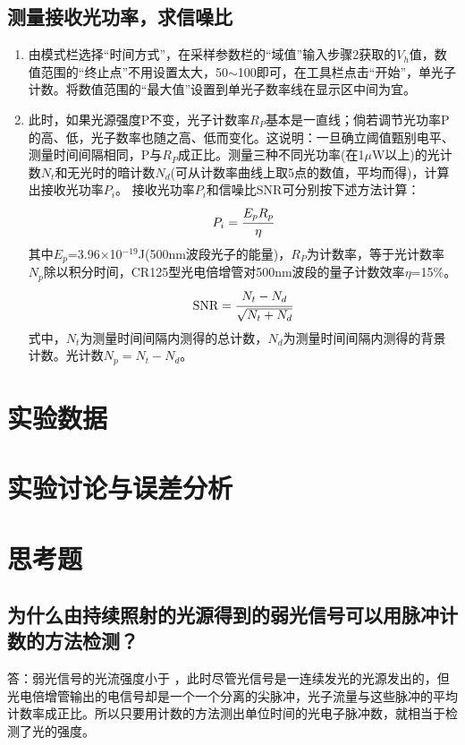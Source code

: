 \documentclass[a4paper]{article}
\begin{document}
\subsection{测量接收光功率，求信噪比}
\begin{enumerate}
\item 由模式栏选择“时间方式”，在采样参数栏的“域值”输入步骤2获取的$V_h$值，数值范围的“终止点”不用设置太大，50$\sim$100即可，在工具栏点击“开始”，单光子计数。将数值范围的“最大值”设置到单光子数率线在显示区中间为宜。 
\item 此时，如果光源强度P不变，光子计数率$R_P$基本是一直线；倘若调节光功率P的高、低，光子数率也随之高、低而变化。这说明：一旦确立阈值甄别电平、测量时间间隔相同，P与$R_P$成正比。测量三种不同光功率(在1$\mu$W以上)的光计数$N_t$和无光时的暗计数$N_d$(可从计数率曲线上取5点的数值，平均而得)，计算出接收光功率$P_i$。
接收光功率$P_i$和信噪比SNR可分别按下述方法计算：
\begin{equation}
P_i = \cfrac{E_pR_p}{\eta}\label{eq4}
\end{equation}
其中$E_p$=3.96×10$^{-19}$J(500nm波段光子的能量)，$R_P$为计数率，等于光计数率$N_p$除以积分时间，CR125型光电倍增管对500nm波段的量子计数效率$\eta$=15\%。
\begin{equation}
\text{SNR} = \cfrac{N_t - N_d}{\sqrt{N_t + N_d}}\label{eq5}
\end{equation}
式中，$N_t$为测量时间间隔内测得的总计数，$N_d$为测量时间间隔内测得的背景计数。光计数$N_p = N_t - N_d$。
\end{enumerate}

\section{实验数据}

\section{实验讨论与误差分析}

\section{思考题}
\subsection{为什么由持续照射的光源得到的弱光信号可以用脉冲计数的方法检测？}
答：弱光信号的光流强度小于 ，此时尽管光信号是一连续发光的光源发出的，但光电倍增管输出的电信号却是一个一个分离的尖脉冲，光子流量与这些脉冲的平均计数率成正比。所以只要用计数的方法测出单位时间的光电子脉冲数，就相当于检测了光的强度。
\end{document}
